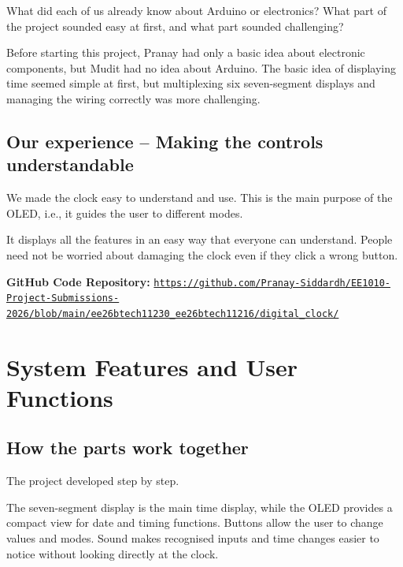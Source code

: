 \documentclass[12pt,letterpaper]{article}
\begin{document}
What did each of us already know about Arduino or electronics? What part of
the project sounded easy at first, and what part sounded challenging?

Before starting this project, Pranay had only a basic idea about electronic
components, but Mudit had no idea about Arduino. The basic idea of displaying
time seemed simple at first, but multiplexing six seven-segment displays and
managing the wiring correctly was more challenging.

\subsection*{Our experience -- Making the controls understandable}

We made the clock easy to understand and use. This is the main purpose of the
OLED, i.e., it guides the user to different modes.

It displays all the features in an easy way that everyone can understand.
People need not be worried about damaging the clock even if they click a
wrong button.

\medskip

\noindent\textbf{GitHub Code Repository:}\quad
\href{https://github.com/Pranay-Siddardh/EE1010-Project-Submissions-2026/blob/main/ee26btech11230_ee26btech11216/digital_clock/}
{\texttt{https://github.com/Pranay-Siddardh/EE1010-Project-Submissions-2026/blob/main/ee26btech11230_ee26btech11216/digital_clock/}}

\clearpage
\section{System Features and User Functions}

\subsection{How the parts work together}

The project developed step by step.

The seven-segment display is the main time display,
while the OLED provides a compact view for date and
timing functions. Buttons allow the user to change values
and modes. Sound makes recognised inputs and time changes
easier to notice without looking directly at the clock.
\end{document}
